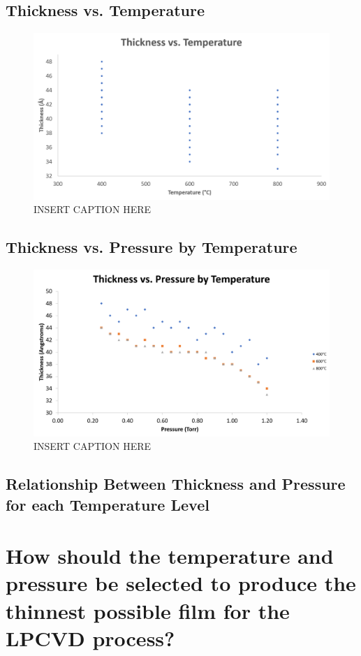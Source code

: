 \documentclass[letterpaper]{article}
\begin{document}
  \subsection{Thickness vs. Temperature}

    \begin{figure}[H]
      \centering
      \includegraphics[width=\textwidth]{thiccvstemp.png}
      \caption{INSERT CAPTION HERE}
      \label{thiccvstemp}
    \end{figure}

  \subsection{Thickness vs. Pressure by Temperature}

    \begin{figure}[H]
      \centering
      \includegraphics[width=\textwidth]{thiccvspressurebytemp.png}
      \caption{INSERT CAPTION HERE}
      \label{thiccvspressurebytemp}
    \end{figure}


  \subsection{Relationship Between Thickness and Pressure for each Temperature Level}

\section{How should the temperature and pressure be selected to produce the thinnest possible film for the LPCVD
process?}
\end{document}
